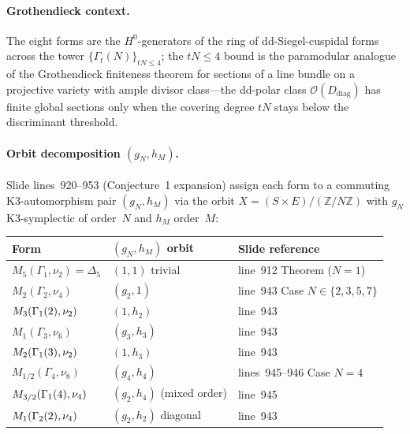 \paragraph{Grothendieck context.}
The eight forms are the $H^0$-generators of the ring of
dd-Siegel-cuspidal forms across the tower
$\{\Gamma_t(N)\}_{tN \leq 4}$; the $tN \leq 4$ bound is the paramodular
analogue of the Grothendieck finiteness theorem for sections of a line
bundle on a projective variety with ample divisor class---the
dd-polar class $\mathcal{O}(D_{\mathrm{diag}})$ has finite global
sections only when the covering degree $tN$ stays below the
discriminant threshold.

\paragraph{Orbit decomposition $(g_N, h_M)$.}
Slide lines~920--953 (Conjecture~1 expansion) assign each form to a
commuting K3-automorphism pair $(g_N, h_M)$ via the orbit
$X = (S \times E)/(\mathbb{Z}/N\mathbb{Z})$ with $g_N$ K3-symplectic of
order~$N$ and $h_M$ order~$M$:

\begin{center}
\small
\begin{tabular}{lll}
\hline
Form & $(g_N, h_M)$ orbit & Slide reference \\
\hline
$M_5(\Gamma_1,\nu_2) = \Delta_5$   & $(1, 1)$ trivial                    & line~912 Theorem ($N=1$) \\
$M_2(\Gamma_2,\nu_4)$              & $(g_2, 1)$                          & line~943 Case $N\in\{2,3,5,7\}$ \\
$M_3(\Gamma_{1}(2),\nu_2)$         & $(1, h_2)$                          & line~943 \\
$M_1(\Gamma_3,\nu_6)$              & $(g_3, h_3)$                        & line~943 \\
$M_2(\Gamma_{1}(3),\nu_2)$         & $(1, h_3)$                          & line~943 \\
$M_{1/2}(\Gamma_4,\nu_8)$          & $(g_4, h_4)$                        & lines~945--946 Case $N=4$ \\
$M_{3/2}(\Gamma_{1}(4),\nu_4)$     & $(g_2, h_4)$ (mixed order)          & line~945 \\
$M_1(\Gamma_{2}(2),\nu_4)$         & $(g_2, h_2)$ diagonal               & line~943 \\
\hline
\end{tabular}
\end{center}

